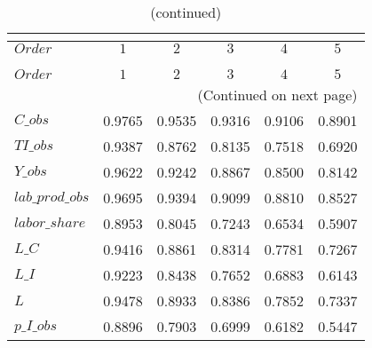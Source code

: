  
\begin{center}
\begin{longtable}{lccccc} 
\caption{COEFFICIENTS OF AUTOCORRELATION}\\
 \label{Table:th_autocorr_matrix}\\
\toprule 
$Order           $	 & 	 $         1$	 & 	 $         2$	 & 	 $         3$	 & 	 $         4$	 & 	 $         5$\\
\midrule \endfirsthead 
\caption{(continued)}\\
 \toprule \\ 
$Order           $	 & 	 $         1$	 & 	 $         2$	 & 	 $         3$	 & 	 $         4$	 & 	 $         5$\\
\midrule \endhead 
\midrule \multicolumn{6}{r}{(Continued on next page)} \\ \bottomrule \endfoot 
\bottomrule \endlastfoot 
$C\_obs          $	 & 	    0.9765	 & 	    0.9535	 & 	    0.9316	 & 	    0.9106	 & 	    0.8901 \\ 
$TI\_obs         $	 & 	    0.9387	 & 	    0.8762	 & 	    0.8135	 & 	    0.7518	 & 	    0.6920 \\ 
$Y\_obs          $	 & 	    0.9622	 & 	    0.9242	 & 	    0.8867	 & 	    0.8500	 & 	    0.8142 \\ 
$lab\_prod\_obs  $	 & 	    0.9695	 & 	    0.9394	 & 	    0.9099	 & 	    0.8810	 & 	    0.8527 \\ 
$labor\_share    $	 & 	    0.8953	 & 	    0.8045	 & 	    0.7243	 & 	    0.6534	 & 	    0.5907 \\ 
$L\_C            $	 & 	    0.9416	 & 	    0.8861	 & 	    0.8314	 & 	    0.7781	 & 	    0.7267 \\ 
$L\_I            $	 & 	    0.9223	 & 	    0.8438	 & 	    0.7652	 & 	    0.6883	 & 	    0.6143 \\ 
$L               $	 & 	    0.9478	 & 	    0.8933	 & 	    0.8386	 & 	    0.7852	 & 	    0.7337 \\ 
$p\_I\_obs       $	 & 	    0.8896	 & 	    0.7903	 & 	    0.6999	 & 	    0.6182	 & 	    0.5447 \\ 
\end{longtable}
 \end{center}
